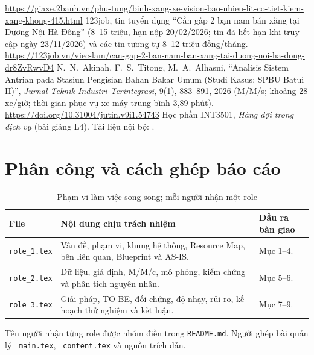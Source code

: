 \begin{thebibliography}{99}
\url{https://giaxe.2banh.vn/phu-tung/binh-xang-xe-vision-bao-nhieu-lit-co-tiet-kiem-xang-khong-415.html}
 123job, tin tuyển dụng ``Cần gấp 2 bạn nam bán xăng tại Dương Nội Hà Đông'' (8--15 triệu, hạn nộp 20/02/2026;
tin đã hết hạn khi truy cập ngày 23/11/2026) và các tin tương tự 8--12 triệu đồng/tháng.
\url{https://123job.vn/viec-lam/can-gap-2-ban-nam-ban-xang-tai-duong-noi-ha-dong-dr8ZvRwvD4}
 N.~N.~Akinah, F.~S.~Titong, M.~A.~Alhasni, ``Analisis Sistem Antrian pada Stasiun Pengisian
Bahan Bakar Umum (Studi Kasus: SPBU Batui II)'', \textit{Jurnal Teknik Industri Terintegrasi}, 9(1), 883--891, 2026
(M/M/s; khoảng 28 xe/giờ; thời gian phục vụ xe máy trung bình 3,89 phút). \url{https://doi.org/10.31004/jutin.v9i1.54743}
 Học phần INT3501, \textit{Hàng đợi trong dịch vụ} (bài giảng L4). Tài liệu nội bộ:
.
\end{thebibliography}

\appendix
\section{Phân công và cách ghép báo cáo}
\label{app:roles}
\begin{table}[H]\centering\small
\caption{Phạm vi làm việc song song; mỗi người nhận một role}
\begin{tabularx}{\linewidth}{@{}p{21mm}Y Y@{}}
\toprule
File & Nội dung chịu trách nhiệm & Đầu ra bàn giao \\
\midrule
\texttt{role\_1.tex} & Vấn đề, phạm vi, khung hệ thống, Resource Map, bên liên quan, Blueprint và AS-IS. & Mục 1--4. \\
\texttt{role\_2.tex} & Dữ liệu, giả định, M/M/c, mô phỏng, kiểm chứng và phân tích nguyên nhân. & Mục 5--6. \\
\texttt{role\_3.tex} & Giải pháp, TO-BE, đối chứng, độ nhạy, rủi ro, kế hoạch thử nghiệm và kết luận. & Mục 7--9. \\
\bottomrule
\end{tabularx}
\end{table}
Tên người nhận từng role được nhóm điền trong \texttt{README.md}.
Người ghép bài quản lý \texttt{\_main.tex}, \texttt{\_content.tex} và nguồn trích dẫn.



